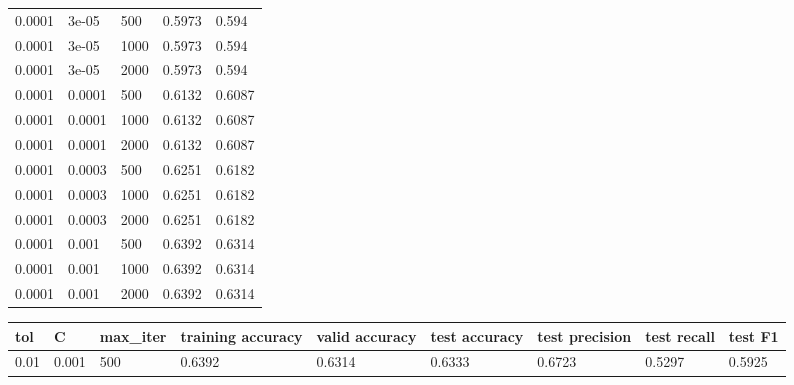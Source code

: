 \documentclass{article}%
\begin{document}
\begin{longtable}{l l l l l}
0.0001&3e{-}05&500&0.5973&0.594\\%
0.0001&3e{-}05&1000&0.5973&0.594\\%
0.0001&3e{-}05&2000&0.5973&0.594\\%
0.0001&0.0001&500&0.6132&0.6087\\%
0.0001&0.0001&1000&0.6132&0.6087\\%
0.0001&0.0001&2000&0.6132&0.6087\\%
0.0001&0.0003&500&0.6251&0.6182\\%
0.0001&0.0003&1000&0.6251&0.6182\\%
0.0001&0.0003&2000&0.6251&0.6182\\%
0.0001&0.001&500&0.6392&0.6314\\%
0.0001&0.001&1000&0.6392&0.6314\\%
0.0001&0.001&2000&0.6392&0.6314\\%
\hline%
\end{longtable}%
\begin{longtable}{l l l l l l l l l}%
\hline%
tol&C&max\_iter&training accuracy&valid accuracy&test accuracy&test precision&test recall&test F1\\%
\hline%
\endhead%
\hline%
0.01&0.001&500&0.6392&0.6314&0.6333&0.6723&0.5297&0.5925\\%
\hline%
\end{longtable}%
\end{document}
